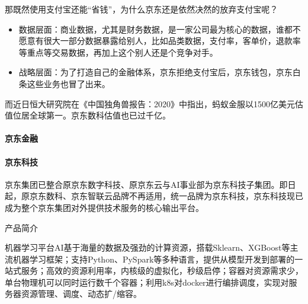 \documentclass[letterpaper,10pt,english]{sphinxmanual}
\begin{document}
那既然使用支付宝还能“省钱”，为什么京东还是依然决然的放弃支付宝呢？
\begin{itemize}
\item {} 
数据层面：商业数据，尤其是财务数据，是一家公司最为核心的数据，谁都不愿意有很大一部分数据暴露给别人，比如品类数据，支付率，客单价，退款率等重点等交易数据，再加上这个别人还是个竞争对手。

\item {} 
战略层面：为了打造自己的金融体系，京东拒绝支付宝后，京东钱包，京东白条这些业务也冒了出来。%
\begin{footnote}[1021]\sphinxAtStartFootnote
{}
%
\end{footnote}

\end{itemize}

而近日恒大研究院在《中国独角兽报告：2020》中指出，蚂蚁金服以1500亿美元估值位居全球第一。京东数科估值也已过千亿。%
\begin{footnote}[1022]\sphinxAtStartFootnote
{}
%
\end{footnote}


\paragraph{京东金融}
\label{\detokenize{chapter_AI_company/jd:id5}}


\paragraph{京东科技}
\label{\detokenize{chapter_AI_company/jd:id6}}
京东集团已整合原京东数字科技、原京东云与AI事业部为京东科技子集团。即日起，原京东数科、京东智联云品牌不再适用，统一品牌为京东科技，京东科技现已成为整个京东集团对外提供技术服务的核心输出平台。

产品简介

机器学习平台AI基于海量的数据及强劲的计算资源，搭载Sklearn、XGBoost等主流机器学习框架；支持Python、PySpark等多种语言，提供从模型开发到部署的一站式服务；高效的资源利用率，内核级的虚拟化，秒级启停；容器对资源需求少，单台物理机可以同时运行数千个容器；利用k8s对docker进行编排调度，实现对服务器资源管理、调度、动态扩/缩容。
\end{document}
